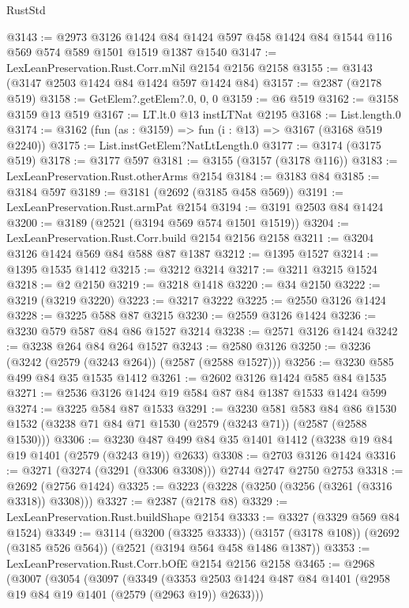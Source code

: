 \begin{lexlean}{RustStd}
\begin{coremodule}
@3143 := @2973
    @3126
    @1424
    @84
    @1424
    @597
    @458
    @1424
    @84
    @1544
    @116
    @569
    @574
    @589
    @1501
    @1519
    @1387
    @1540
@3147 := LexLeanPreservation.Rust.Corr.mNil @2154 @2156 @2158
@3155 := @3143 (@3147 @2503 @1424 @84 @1424 @597 @1424 @84)
@3157 := @2387 (@2178 @519)
@3158 := GetElem?.getElem?.{0, 0, 0}
@3159 := @6 @519
@3162 := @3158 @3159 @13 @519
@3167 := LT.lt.{0} @13 instLTNat @2195
@3168 := List.length.{0}
@3174 := @3162 (fun (as : @3159) => fun (i : @13) => @3167 (@3168 @519 @2240))
@3175 := List.instGetElem?NatLtLength.{0}
@3177 := @3174 (@3175 @519)
@3178 := @3177 @597
@3181 := @3155 (@3157 (@3178 @116))
@3183 := LexLeanPreservation.Rust.otherArms @2154
@3184 := @3183 @84
@3185 := @3184 @597
@3189 := @3181 (@2692 (@3185 @458 @569))
@3191 := LexLeanPreservation.Rust.armPat @2154
@3194 := @3191 @2503 @84 @1424
@3200 := @3189 (@2521 (@3194 @569 @574 @1501 @1519))
@3204 := LexLeanPreservation.Rust.Corr.build @2154 @2156 @2158
@3211 := @3204 @3126 @1424 @569 @84 @588 @87 @1387
@3212 := @1395 @1527
@3214 := @1395 @1535 @1412
@3215 := @3212 @3214
@3217 := @3211 @3215 @1524
@3218 := @2 @2150
@3219 := @3218 @1418
@3220 := @34 @2150
@3222 := @3219 (@3219 @3220)
@3223 := @3217 @3222
@3225 := @2550 @3126 @1424
@3228 := @3225 @588 @87 @3215
@3230 := @2559 @3126 @1424
@3236 := @3230 @579 @587 @84 @86 @1527 @3214
@3238 := @2571 @3126 @1424
@3242 := @3238 @264 @84 @264 @1527
@3243 := @2580 @3126
@3250 := @3236 (@3242 (@2579 (@3243 @264)) (@2587 (@2588 @1527)))
@3256 := @3230 @585 @499 @84 @35 @1535 @1412
@3261 := @2602 @3126 @1424 @585 @84 @1535
@3271 := @2536 @3126 @1424 @19 @584 @87 @84 @1387 @1533 @1424 @599
@3274 := @3225 @584 @87 @1533
@3291 := @3230
    @581
    @583
    @84
    @86
    @1530
    @1532
    (@3238 @71 @84 @71 @1530 (@2579 (@3243 @71)) (@2587 (@2588 @1530)))
@3306 := @3230 @487 @499 @84 @35 @1401 @1412 (@3238 @19 @84 @19 @1401 (@2579 (@3243 @19)) @2633)
@3308 := @2703 @3126 @1424
@3316 := @3271 (@3274 (@3291 (@3306 @3308))) @2744 @2747 @2750 @2753
@3318 := @2692 (@2756 @1424)
@3325 := @3223 (@3228 (@3250 (@3256 (@3261 (@3316 @3318)) @3308)))
@3327 := @2387 (@2178 @8)
@3329 := LexLeanPreservation.Rust.buildShape @2154
@3333 := @3327 (@3329 @569 @84 @1524)
@3349 := @3114
    (@3200 (@3325 @3333))
    (@3157 (@3178 @108))
    (@2692 (@3185 @526 @564))
    (@2521 (@3194 @564 @458 @1486 @1387))
@3353 := LexLeanPreservation.Rust.Corr.bOfE @2154 @2156 @2158
@3465 := @2968
    (@3007
      (@3054
        (@3097
          (@3349
            (@3353 @2503 @1424 @487 @84 @1401 (@2958 @19 @84 @19 @1401 (@2579 (@2963 @19)) @2633)))

\end{coremodule}
\end{lexlean}
